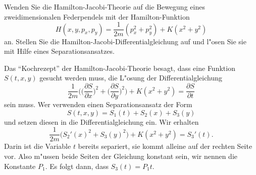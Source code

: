 Wenden Sie die Hamilton-Jacobi-Theorie auf die Bewegung eines
zweidimensionalen Federpendels mit der Hamilton-Funktion 
\[
H(x,y,p_x,p_y)=\frac1{2m}(p_x^2+p_y^2)+K(x^2 + y^2)
\]
an. Stellen Sie die Hamilton-Jacobi-Differentialgleichung auf
und l"osen Sie sie mit Hilfe eines Separationsansatzes.

\begin{loesung}
Das ``Kochrezept'' der Hamilton-Jacobi-Theorie besagt, dass eine
Funktion $S(t, x, y)$ gesucht werden muss, die L"osung
der Differentialgleichung
\[
\frac1{2m}\biggl(
\biggl(\frac{\partial S}{\partial x}\biggr)^2
+
\biggl(\frac{\partial S}{\partial y}\biggr)^2
\biggr)+K(x^2+y^2)=\frac{\partial S}{\partial t}
\]
sein muss. Wer verwenden einen Separationsansatz der Form
\[
S(t,x,y)=S_1(t)+S_2(x)+S_3(y)
\]
und setzen diesen in die Differentialgleichung ein.
Wir erhalten
\[
\frac1{2m}\bigl( S_2'(x)^2+S_3(y)^2 \bigr)+K(x^2+y^2)=S_3'(t).
\]
Darin ist die Variable $t$ bereits separiert, sie kommt alleine auf
der rechten Seite vor. Also m"ussen beide Seiten der Gleichung konstant
sein, wir nennen die Konstante $P_1$. Es folgt dann, dass 
$S_3(t)=P_1t.$


\end{loesung}
